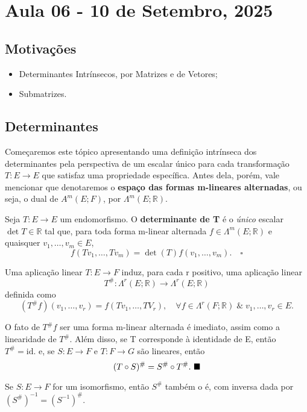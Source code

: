 \documentclass[../differential_forms.tex]{subfiles}
\begin{document}
\section{Aula 06 - 10 de Setembro, 2025}
\subsection{Motivações}
\begin{itemize}
	\item Determinantes Intrínsecos, por Matrizes e de Vetores;
	\item Submatrizes.
\end{itemize}
\subsection{Determinantes}
Começaremos este tópico apresentando uma definição intrínseca dos determinantes pela perspectiva de um escalar único para cada transformação \(T:E\rightarrow E\) que satisfaz uma propriedade específica. Antes dela, porém, vale mencionar que denotaremos o \textbf{espaço das formas m-lineares alternadas}, ou seja, o dual de \(A^{m}(E; F)\), por \(\Lambda^{m}(E; \mathbb{R})\).
\begin{def*}
	Seja \(T:E\rightarrow E\) um endomorfismo. O \textbf{determinante de T} é o \textit{único} escalar \(\det{T}\in \mathbb{R}\) tal que, para toda forma m-linear alternada \(f\in \Lambda^{m}(E; \mathbb{R})\) e quaisquer \(v_1,\dotsc , v_{m}\in E\),
	\[
		f(Tv_1,\dotsc , Tv_{m}) = \det{(T)} f(v_1,\dotsc ,v_{m}). \quad \square
	\]
\end{def*}
\begin{prop*}
	Uma aplicação linear \(T:E\rightarrow F\) induz, para cada r positivo, uma aplicação linear
	\[
		T^{\#}: \Lambda^{r}(E; \mathbb{R})\rightarrow \Lambda^{r}(E; \mathbb{R})
	\]
	definida como
	\[
		(T^{\#}f)(v_1,\dotsc ,v_r)= f(Tv_1,\dotsc ,TV_r),\quad \forall f\in \Lambda ^{r}(F; \mathbb{R})\;\&\; v_1,\dotsc ,v_r\in E.
	\]
\end{prop*}
\begin{proof*}
	O fato de \(T^{\#}f\) ser uma forma m-linear alternada é imediato, assim como a linearidade de \(T^{\#}.\) Além disso, se T corresponde à identidade de E, então \(T^{\#}=\mathrm{id}.\) e, se \(S:E\rightarrow F\) e \(T:F\rightarrow G\) são lineares, então
	\[
		(T \circ S)^{\#}=S^{\#}\circ T^{\#}.\text{ $\blacksquare$}
	\]
\end{proof*}
\begin{crl*}
	Se \(S:E\rightarrow F\) for um isomorfismo, então \(S^{\#}\) também o é, com inversa dada por \((S^{\#})^{-1}=(S^{-1})^{\#}\).
\end{crl*}
\end{document}
